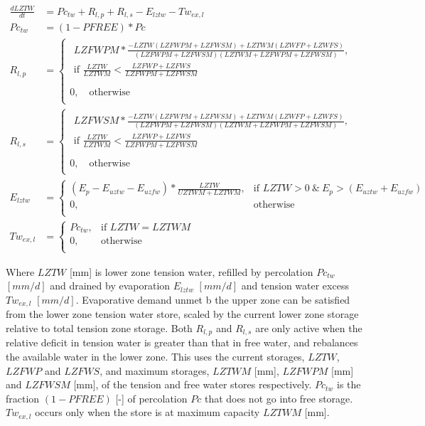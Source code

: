 \begin{align}
	\frac{dLZTW}{dt} &= Pc_{tw} + R_{l,p} + R_{l,s} - E_{lztw} - Tw_{ex,l} \\
	Pc_{tw} &= (1-PFREE)*Pc\\
	R_{l,p} &= \begin{cases}
		\begin{aligned}
		LZFWPM*\frac{-LZTW(LZFWPM+LZFWSM)+LZTWM(LZWFP+LZWFS)}{(LZFWPM+LZFWSM)(LZTWM+LZFWPM+LZFWSM)}, \\
				\text{if } \frac{LZTW}{LZTWM} < \frac{LZFWP+LZFWS}{LZFWPM+LZFWSM}\\
		\end{aligned}\\
		0, \quad \text{otherwise} \\
	\end{cases}\\	
	R_{l,s} &= \begin{cases}
		\begin{aligned}
		LZFWSM*\frac{-LZTW(LZFWPM+LZFWSM)+LZTWM(LZWFP+LZWFS)}{(LZFWPM+LZFWSM)(LZTWM+LZFWPM+LZFWSM)}, \\
			\text{if } \frac{LZTW}{LZTWM} < \frac{LZFWP+LZFWS}{LZFWPM+LZFWSM}\\
		\end{aligned}\\
		0, \quad \text{otherwise} \\
	\end{cases}\\	
	E_{lztw} &= \begin{cases}
		\left(E_p-E_{uztw}-E_{uzfw}\right)*\frac{LZTW}{UZTWM+LZTWM}, &\text{if } LZTW > 0 ~\&~ E_p > (E_{uztw}+E_{uzfw}) \\
		0, & \text{otherwise} \\
	\end{cases}\\
	Tw_{ex,l} &= \begin{cases}
		Pc_{tw}, &\text{if } LZTW = LZTWM \\
		0, & \text{otherwise} \\
	\end{cases}
\end{align}

Where $ LZTW$ [mm] is lower zone tension water, refilled by percolation $Pc_{tw}$ $[mm/d]$ and drained by evaporation $E_{lztw}$ $[mm/d]$ and tension water excess $Tw_{ex,l}$ $[mm/d]$.
Evaporative demand unmet b the upper zone can be satisfied from the lower zone tension water store, scaled by the current lower zone storage relative to total tension zone storage.
Both $R_{l,p}$ and $R_{l,s}$ are only active when the relative deficit in tension water is greater than that in free water, and rebalances the available water in the lower zone. This uses the current storages, $LZTW$, $LZFWP$ and $LZFWS$, and maximum storages, $LZTWM$ [mm], $LZFWPM$ [mm] and $LZFWSM$ [mm], of the tension and free water stores respectively.
$Pc_{tw}$ is the fraction $(1-PFREE)$ [-] of percolation $Pc$ that does not go into free storage.
$Tw_{ex,l}$ occurs only when the store is at maximum capacity $LZTWM$ [mm].

